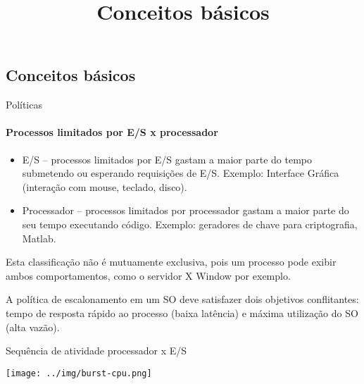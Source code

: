 
\title{\insertlecture}

\frame{\maketitle}

\section{\insertlecture}

\def\thetitle{Conceitos básicos}
\title{\thetitle}
\frame{\date{}\author{}\titlepage}

\subsection{\thetitle}

\begin{frame}{Políticas}
  \framesubtitle{Processos limitados por E/S x processador}
\small
  \begin{itemize}
  \item E/S -- processos limitados por E/S gastam a maior parte do
    tempo submetendo ou esperando requisições de E/S. Exemplo:
    Interface Gráfica (interação com mouse, teclado, disco).
  \item Processador -- processos limitados por processador gastam a
    maior parte do seu tempo executando código. Exemplo: geradores de
    chave para criptografia, {\sc Matlab}.
  \end{itemize}
  Esta classificação não é mutuamente exclusiva, pois um processo pode
  exibir ambos comportamentos, como o servidor {\sc X Window} por exemplo.
\bigskip

  \alert{A política de escalonamento em um SO deve satisfazer dois objetivos
  conflitantes: tempo de resposta rápido ao processo (baixa latência)
  e máxima utilização do SO (alta vazão).}

\end{frame}

\begin{frame}{Sequência de atividade processador x E/S}
\begin{center}
  \texttt{[image: ../img/burst-cpu.png]}
\end{center}
\end{frame}

